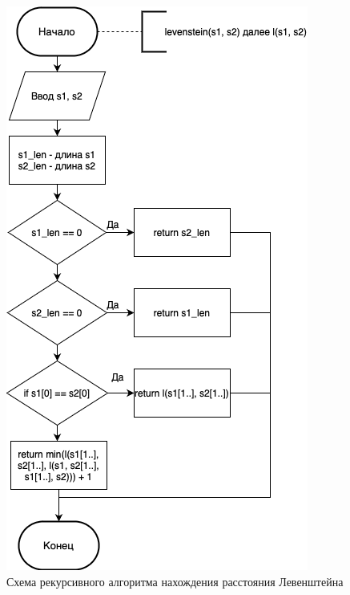 \documentclass[14pt,russian]{scrartcl}
\begin{document}
\begin{figure}[h]
	\centering
	\includegraphics[scale=0.9]{lev_rec.png}
	\caption{Схема рекурсивного алгоритма нахождения расстояния Левенштейна}
	\label{fig:rec_lev}
\end{figure}
\end{document}
